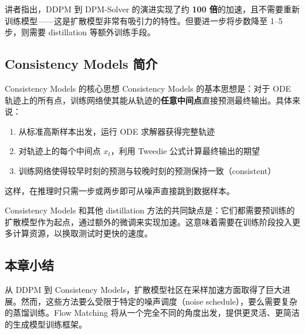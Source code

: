 讲者指出，DDPM 到 DPM-Solver 的演进实现了约 \textbf{100 倍}的加速，且不需要重新训练模型——这是扩散模型非常有吸引力的特性。但要进一步将步数降至 1--5 步，则需要 distillation 等额外训练手段。

\subsection{Consistency Models 简介}

\begin{importantbox}{Consistency Models 的核心思想}
Consistency Models 的基本思想是：对于 ODE 轨迹上的所有点，训练网络使其能从轨迹的\textbf{任意中间点}直接预测最终输出。具体来说：
\begin{enumerate}
    \item 从标准高斯样本出发，运行 ODE 求解器获得完整轨迹
    \item 对轨迹上的每个中间点 $x_t$，利用 Tweedie 公式计算最终输出的期望
    \item 训练网络使得较早时刻的预测与较晚时刻的预测保持一致（consistent）
\end{enumerate}
这样，在推理时只需一步或两步即可从噪声直接跳到数据样本。
\end{importantbox}

Consistency Models 和其他 distillation 方法的共同缺点是：它们都需要预训练的扩散模型作为起点，通过额外的微调来实现加速。这意味着需要在训练阶段投入更多计算资源，以换取测试时更快的速度。

\subsection{本章小结}

从 DDPM 到 Consistency Models，扩散模型社区在采样加速方面取得了巨大进展。然而，这些方法要么受限于特定的噪声调度（noise schedule），要么需要复杂的蒸馏训练。Flow Matching 将从一个完全不同的角度出发，提供更灵活、更简洁的生成模型训练框架。

